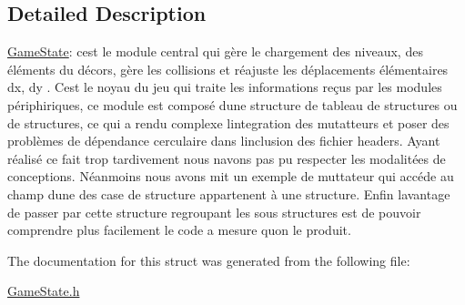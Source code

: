 \subsection{Detailed Description}
\hyperlink{struct_game_state}{Game\+State}\+: c\textquotesingle{}est le module central qui gère le chargement des niveaux, des éléments du décors, gère les collisions et réajuste les déplacements élémentaires dx, dy . C\textquotesingle{}est le noyau du jeu qui traite les informations reçus par les modules périphiriques, ce module est composé d\textquotesingle{}une structure de tableau de structures ou de structures, ce qui a rendu complexe l\textquotesingle{}integration des mutatteurs et poser des problèmes de dépendance cerculaire dans l\textquotesingle{}inclusion des fichier headers. Ayant réalisé ce fait trop tardivement nous n\textquotesingle{}avons pas pu respecter les modalitées de conceptions. Néanmoins nous avons mit un exemple de muttateur qui accéde au champ d\textquotesingle{}une des case de structure appartenent à une structure. Enfin l\textquotesingle{}avantage de passer par cette structure regroupant les sous structures est de pouvoir comprendre plus facilement le code a mesure qu\textquotesingle{}on le produit. 

The documentation for this struct was generated from the following file\+:\begin{DoxyCompactItemize}
\item 
\hyperlink{_game_state_8h}{Game\+State.\+h}\end{DoxyCompactItemize}
